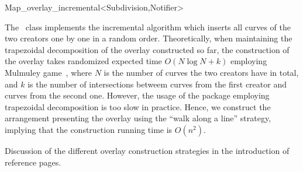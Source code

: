 
\ccRefPageBegin


\renewcommand{\ccRefPageBegin}{\begin{ccAdvanced}}
\renewcommand{\ccRefPageEnd}{\end{ccAdvanced}}

\begin{ccRefClass}{Map_overlay_incremental<Subdivision,Notifier>}
\label{OVL_sec:incremental}

The \ccRefName\ class implements the incremental algorithm which inserts 
all curves of the two creators one by one in a random order. 
Theoretically, when maintaining the trapezoidal decomposition of 
the overlay constructed so far, the construction of the overlay 
takes randomized expected time $O(N\log{N} + k)$ employing Mulmuley game~\cite{m-cgitr-93},
where $N$ is the number of curves the two creators have in total, 
and $k$ is the number of intersections betweem curves 
from the first creator and curves from the second one. 
However, the usage of the 
package employing trapezoidal decomposition is too slow in practice. 
Hence, we construct the arrangement presenting the overlay 
using the ``walk along a line'' strategy, implying that the construction 
running time is $O(n^2)$.


\ccIsModel

\ccInheritsFrom

\ccSeeAlso
   Discussion of the different overlay construction strategies in the introduction
of  reference pages.

\end{ccRefClass}
\renewcommand{\ccRefPageBegin}{}
\renewcommand{\ccRefPageEnd}{}


\ccRefPageEnd
